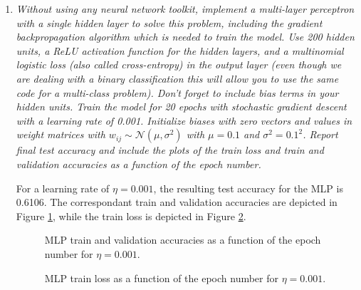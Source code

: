 \documentclass[12pt]{article}
\begin{document}
\begin{enumerate}[leftmargin=\labelsep]
\begin{enumerate}[label=\alph*)]
                    \vspace{12pt}

              \item \textit{Without using any neural network toolkit, implement a multi-layer
                    perceptron with a single hidden layer to solve this problem, including the gradient
                    backpropagation algorithm which is needed to train the model. Use 200 hidden units,
                    a ReLU activation function for the hidden layers, and a multinomial logistic loss (also
                    called cross-entropy) in the output layer (even though we are dealing with a binary
                    classification this will allow you to use the same code for a multi-class problem). Don’t
                    forget to include bias terms in your hidden units. Train the model for 20 epochs with
                    stochastic gradient descent with a learning rate of 0.001. Initialize biases with zero
                    vectors and values in weight matrices with $w_{ij} \sim \mathcal{N}(\mu, \sigma^2)$ with $\mu = 0.1$ and $\sigma^2 = {0.1}^2$. Report final test accuracy and include the plots of the train loss and train and validation
                    accuracies as a function of the epoch number.
                    }

                    \vspace{12pt}

                    For a learning rate of $\eta = 0.001$, the resulting test accuracy for the MLP is 0.6106. The correspondant train and validation accuracies are depicted in Figure \ref{fig:mlp-20-0.001}, while the train loss is depicted in Figure \ref{fig:mlp-20-0.001-loss}.

                    \begin{figure}[H]
                        \centering
                        
                        \caption{MLP train and validation accuracies as a function of the epoch number for $\eta = 0.001$.}
                        \label{fig:mlp-20-0.001}
                    \end{figure}

                    \begin{figure}[H]
                        \centering
                        
                        \caption{MLP train loss as a function of the epoch number for $\eta = 0.001$.}
                        \label{fig:mlp-20-0.001-loss}
                    \end{figure}

                    \vspace{12pt}

          \end{enumerate}

\end{enumerate}
\end{document}
